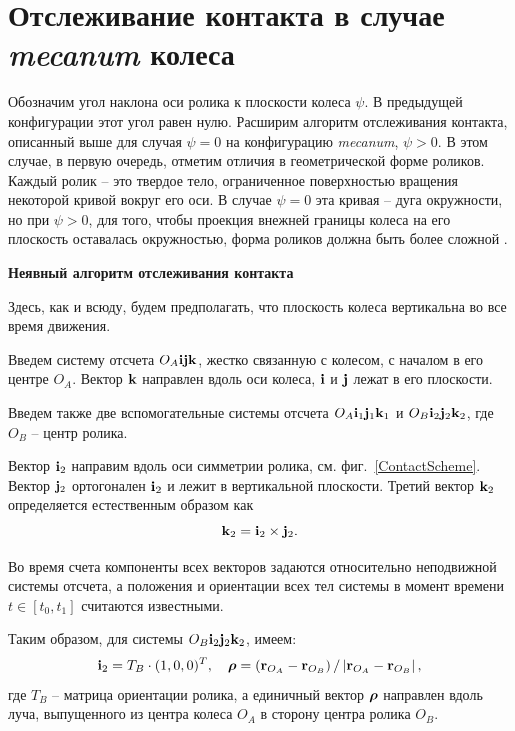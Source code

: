 \section{Отслеживание контакта в случае \textit{mecanum} колеса}

Обозначим угол наклона оси ролика к плоскости колеса $\psi$. В предыдущей конфигурации этот угол равен нулю. Расширим алгоритм отслеживания контакта, описанный выше для случая $\psi = 0$ на конфигурацию \textit{mecanum}, $\psi > 0$. В этом случае, в первую очередь, отметим отличия в геометрической форме роликов. Каждый ролик -- это твердое тело, ограниченное поверхностью вращения некоторой кривой вокруг его оси. В случае $\psi = 0$ эта кривая -- дуга окружности, но при $\psi > 0$, для того, чтобы проекция внежней границы колеса на его плоскость оставалась окружностью, форма роликов должна быть более сложной \cite{Gfrerrer2008}.

\textbf{Неявный алгоритм отслеживания контакта}

Здесь, как и всюду, будем предполагать, что плоскость колеса вертикальна во все время движения.

Введем систему отсчета $O_A{\bf i}{\bf j}{\bf k}$, жестко связанную с колесом, с началом в его центре $O_A$. Вектор ${\bf k}$ направлен вдоль оси колеса, ${\bf i}$ и ${\bf j}$ лежат в его плоскости.

Введем также две вспомогательные системы отсчета $O_A{\bf i}_1{\bf j}_1{\bf k}_1$ и $O_B{\bf i}_2{\bf j}_2{\bf k}_2$, где $O_B$ -- центр ролика.

Вектор ${\bf i}_2$ направим вдоль оси симметрии ролика, см. фиг.~\ref{ContactScheme}.
Вектор ${\bf j}_2$ ортогонален ${\bf i}_2$ и лежит в вертикальной плоскости.
Третий вектор ${\bf k}_2$ определяется естественным образом как
$$
{\bf k}_2={\bf i}_2\times {\bf j}_2.
$$

Во время счета компоненты всех векторов задаются относительно неподвижной системы отсчета, а положения и ориентации всех тел системы в момент времени $t\in [t_0,t_1]$ считаются известными.

Таким образом, для системы $O_B{\bf i}_2{\bf j}_2{\bf k}_2$, имеем:
$$
{\bf i}_2=T_B\cdot (1,0,0)^T,\quad\boldsymbol{\mathbf{\rho}} =
\left( {\bf r}_{O_A}-{\bf r}_{O_B}\right) /
\left| {\bf r}_{O_A}-{\bf r}_{O_B}\right| ,
$$
где $T_B$ -- матрица ориентации ролика, а единичный вектор $\boldsymbol{\mathbf{\rho}}$ направлен вдоль луча, выпущенного из центра колеса $O_A$ в сторону центра ролика $O_B$.

